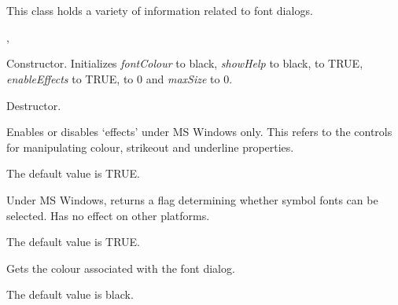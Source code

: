 \section{}\label{wxfontdata}


This class holds a variety of information related to font dialogs.




, 




Constructor. Initializes {\it fontColour} to black, {\it showHelp} to black,
 to TRUE, {\it enableEffects} to TRUE,
 to 0 and {\it maxSize} to 0.



Destructor.



Enables or disables `effects' under MS Windows only. This refers to the
controls for manipulating colour, strikeout and underline properties.

The default value is TRUE.



Under MS Windows, returns a flag determining whether symbol fonts can be selected. Has no
effect on other platforms.

The default value is TRUE.



Gets the colour associated with the font dialog.

The default value is black.


